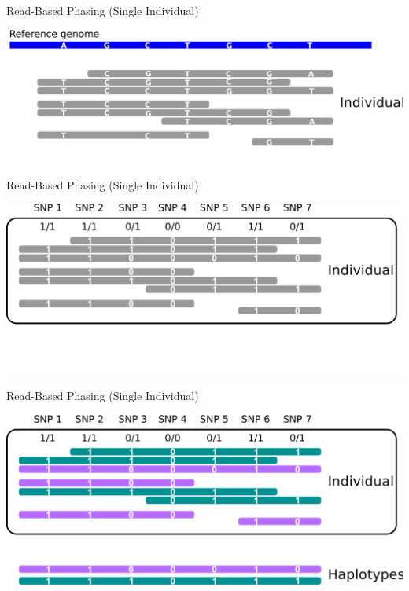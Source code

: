 \documentclass[notes=hide]{beamer}
\begin{document}
\begin{frame}{Read-Based Phasing (Single Individual)}
\begin{center}
\includegraphics[scale=.35]{figs/sih-phasing-complete2.pdf}
\end{center}
\end{frame}

\begin{frame}{Read-Based Phasing (Single Individual)}
\begin{center}
\includegraphics[scale=.35]{figs/sih-phasing-complete1.pdf}
\end{center}
\end{frame}

\begin{frame}{Read-Based Phasing (Single Individual)}
	\begin{center}
		\includegraphics[scale=.35]{figs/sih-phasing-complete-haplo.pdf}		
	\end{center}
\end{frame}
\end{document}
